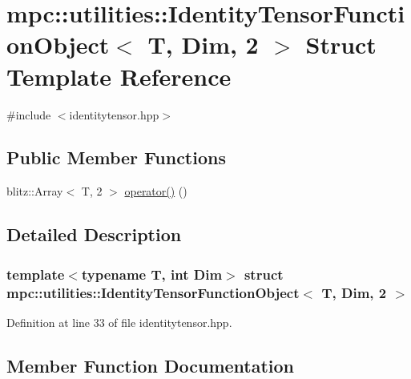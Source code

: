 \hypertarget{structmpc_1_1utilities_1_1_identity_tensor_function_object_3_01_t_00_01_dim_00_012_01_4}{}\section{mpc\+:\+:utilities\+:\+:Identity\+Tensor\+Function\+Object$<$ T, Dim, 2 $>$ Struct Template Reference}
\label{structmpc_1_1utilities_1_1_identity_tensor_function_object_3_01_t_00_01_dim_00_012_01_4}


{\ttfamily \#include $<$identitytensor.\+hpp$>$}

\subsection*{Public Member Functions}
\begin{DoxyCompactItemize}
\item 
blitz\+::\+Array$<$ T, 2 $>$ \mbox{\hyperlink{structmpc_1_1utilities_1_1_identity_tensor_function_object_3_01_t_00_01_dim_00_012_01_4_a7c1da2477c74a9335092b140c8536bd1}{operator()}} ()
\end{DoxyCompactItemize}


\subsection{Detailed Description}
\subsubsection*{template$<$typename T, int Dim$>$\newline
struct mpc\+::utilities\+::\+Identity\+Tensor\+Function\+Object$<$ T, Dim, 2 $>$}



Definition at line 33 of file identitytensor.\+hpp.



\subsection{Member Function Documentation}
\mbox{\label{structmpc_1_1utilities_1_1_identity_tensor_function_object_3_01_t_00_01_dim_00_012_01_4_a7c1da2477c74a9335092b140c8536bd1}} 
